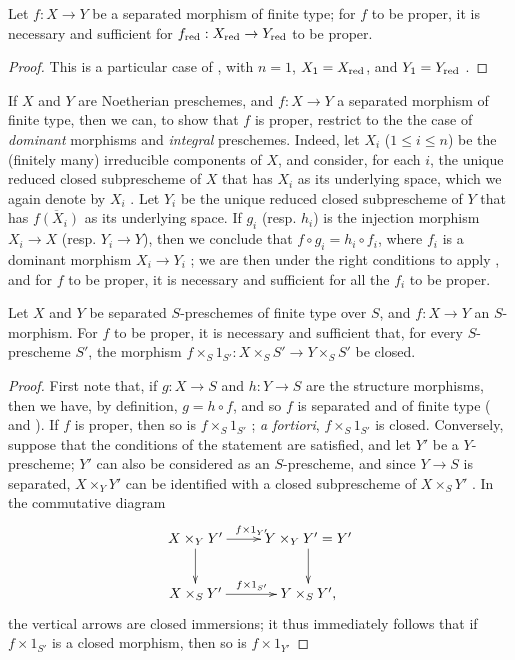\begin{cor}[5.4.6]
\label{2.5.4.6}
Let $f:X\to Y$ be a separated morphism of finite type; for $f$ to be proper, it is necessary and sufficient for $f_\red:X_\red\to Y_\red$ to be proper.
\end{cor}

\begin{proof}
\label{proof-2.5.4.6}
This is a particular case of , with $n=1$, $X_1=X_{\mathrm{red}}$, and $Y_1=Y_{\mathrm{red}}$ .
\end{proof}

\begin{env}[5.4.7]
\label{2.5.4.7}
If $X$ and $Y$ are Noetherian preschemes, and $f:X\to Y$ a separated morphism of finite type, then we can, to show that $f$ is proper, restrict to the the case of \emph{dominant} morphisms and \emph{integral} preschemes.
Indeed, let $X_i$ ($1\leq i\leq n$) be the (finitely many) irreducible components of $X$, and consider, for each $i$, the unique reduced closed subprescheme of $X$ that has $X_i$ as its underlying space, which we again denote by $X_i$ .
Let $Y_i$ be the unique reduced closed subprescheme of $Y$ that has $\overline{f(X_i)}$ as its underlying space.
If $g_i$ (resp. $h_i$) is the injection morphism $X_i\to X$ (resp. $Y_i\to Y$), then we conclude that $f\circ g_i=h_i\circ f_i$, where $f_i$ is a dominant morphism $X_i\to Y_i$ ;
we are then under the right conditions to apply , and for $f$ to be proper, it is necessary and sufficient for all the $f_i$ to be proper.
\end{env}

\begin{cor}[5.4.8]
\label{2.5.4.8}
Let $X$ and $Y$ be separated $S$-preschemes of finite type over $S$, and $f:X\to Y$ an $S$-morphism.
For $f$ to be proper, it is necessary and sufficient that, for every $S$-prescheme $S'$, the morphism $f\times_S 1_{S'}:X\times_S S'\to Y\times_S S'$ be closed.
\end{cor}

\begin{proof}
\label{proof-2.5.4.8}
First note that, if $g:X\to S$ and $h:Y\to S$ are the structure morphisms, then we have, by definition, $g=h\circ f$, and so $f$ is separated and of finite type ( and ).
If $f$ is proper, then so is $f\times_S 1_{S'}$ ; \emph{a fortiori}, $f\times_S 1_{S'}$ is closed.
Conversely, suppose that the conditions of the statement are satisfied, and let $Y'$ be a $Y$-prescheme;
$Y'$ can also be considered as an $S$-prescheme, and since $Y\to S$ is separated, $X\times_Y Y'$ can be identified with a closed subprescheme of $X\times_S Y'$ .
In the commutative diagram
\[
  \xymatrix{
    X\times_Y Y'\ar[r]^{f\times1_{Y'}}\ar[d] &
    Y\times_Y Y'=Y'\ar[d]\\
    X\times_S Y'\ar[r]^{f\times1_{S'}} &
    Y\times_S Y',
  }
\]
the vertical arrows are closed immersions; it thus immediately follows that if $f\times1_{S'}$ is a closed morphism, then so is $f\times1_{Y'}$
\end{proof}

